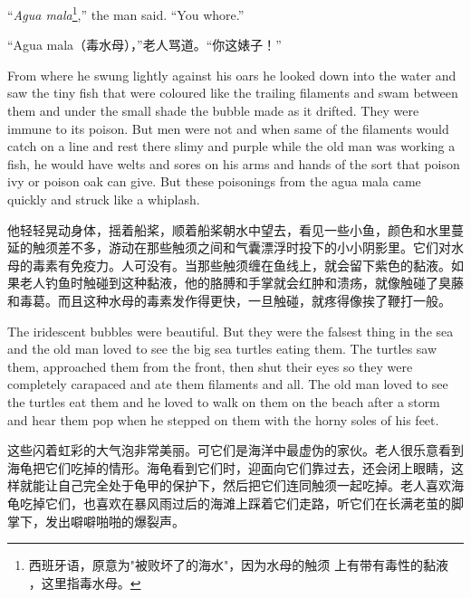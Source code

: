 \begin{paracol}{2}
\switchcolumn*

``\emph{Agua mala}\footnote{西班牙语，原意为"被败坏了的海水"，因为水母的触须
  上有带有毒性的黏液 ，这里指毒水母。},'' the man said. ``You \gls{whore}.''

\switchcolumn

“Agua mala（毒水母），”老人骂道。“你这婊子！”

\switchcolumn*

From where he \gls{swung} lightly against his oars he looked down into the
water and saw the tiny fish that were coloured like the trailing filaments
and swam between them and under the small shade the bubble made as it
drifted. They were \gls{immune} to its \gls{poison}. But men were not and
when same of the filaments would catch on a line and rest there \gls{slimy}
and purple while the old man was working a fish, he would have \glspl{welt}
and \glspl{sore} on his arms and hands of the sort that poison \gls{ivy} or poison
\gls{oak} can give. But these \glspl{poisoning} from the agua mala came quickly and
\gls{struck} like a \gls{whiplash}.

\switchcolumn

他轻轻晃动身体，摇着船桨，顺着船桨朝水中望去，看见一些小鱼，颜色和水里蔓延的触须差不多，游动在那些触须之间和气囊漂浮时投下的小小阴影里。它们对水母的毒素有免疫力。人可没有。当那些触须缠在鱼线上，就会留下紫色的黏液。如果老人钓鱼时触碰到这种黏液，他的胳膊和手掌就会红肿和溃疡，就像触碰了臭藤和毒葛。而且这种水母的毒素发作得更快，一旦触碰，就疼得像挨了鞭打一般。

\switchcolumn*

The iridescent bubbles were beautiful. But they were the \gls{falsest} thing
in the sea and the old man loved to see the big sea turtles eating
them. The turtles saw them, \gls{approached} them from the front, then shut
their eyes so they were completely \gls{carapaced} and ate them filaments
and all. The old man loved to see the turtles eat them and he loved to walk
on them on the beach after a storm and hear them pop when he stepped on them
with the \gls{horny} \glspl{sole} of his feet.

\switchcolumn

这些闪着虹彩的大气泡非常美丽。可它们是海洋中最虚伪的家伙。老人很乐意看到海龟把它们吃掉的情形。海龟看到它们时，迎面向它们靠过去，还会闭上眼睛，这样就能让自己完全处于龟甲的保护下，然后把它们连同触须一起吃掉。老人喜欢海龟吃掉它们，也喜欢在暴风雨过后的海滩上踩着它们走路，听它们在长满老茧的脚掌下，发出噼噼啪啪的爆裂声。

\switchcolumn*


\end{paracol}
